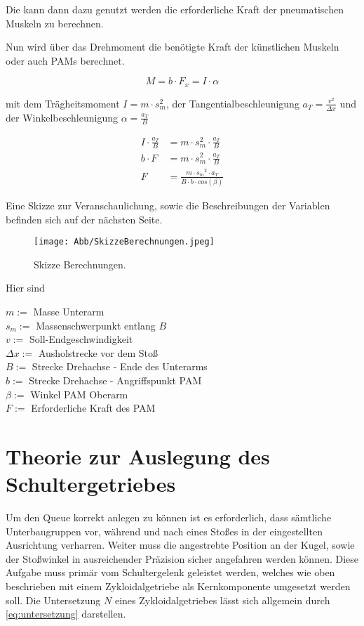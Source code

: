 		Die kann dann dazu genutzt werden die erforderliche Kraft der pneumatischen Muskeln zu berechnen. \par
		Nun wird über das Drehmoment die benötigte Kraft der künstlichen Muskeln oder auch PAMs berechnet. 



		\begin{equation}
			M = b \cdot F_x = I \cdot \alpha%
			\label{eq:DrehmomentArm}
		\end{equation}

		mit dem Trägheitsmoment \( I = m \cdot s_m^2 \), der Tangentialbeschleunigung \( a_T = \frac{v^2}{\Delta x} \) und der
		Winkelbeschleunigung \( \alpha = \frac{a_T}{B} \) \par\medskip

		\begin{align}
			I \cdot \frac{a_T}{B} &= m \cdot s_m^2 \cdot \frac{a_T}{B} \nonumber\\
			b \cdot F &= m \cdot s_m^2 \cdot \frac{a_T}{B} \nonumber\\
			F &=\frac{m \cdot {s_m}^2 \cdot a_T}{B \cdot b \cdot cos(\beta)}%
			\label{eq:Kraft-PAM}
		\end{align}

		Eine Skizze zur Veranschaulichung, sowie die Beschreibungen der Variablen befinden sich auf der nächsten Seite. 

		\newpage
		\begin{figure}[h]
			\centering
			\texttt{[image: Abb/SkizzeBerechnungen.jpeg]}
			\caption{Skizze Berechnungen.}%
			\label{fig:SkizzeBerechnungen}
		\end{figure}

		Hier sind

		\( m := \) Masse Unterarm \\
		\( s_m := \) Massenschwerpunkt entlang $ B $ \\
		\( v := \) Soll-Endgeschwindigkeit \\
		\( \Delta x := \) Ausholstrecke vor dem Stoß \\
		\( B := \) Strecke Drehachse - Ende des Unterarms \\
		\( b:= \) Strecke Drehachse - Angriffspunkt PAM \\
		\( \beta := \) Winkel PAM  Oberarm \\
		\( F:= \) Erforderliche Kraft des PAM

	\section{Theorie zur Auslegung des Schultergetriebes}
		Um den Queue korrekt anlegen zu können ist es erforderlich, dass sämtliche Unterbaugruppen vor, während und nach eines Stoßes in der eingestellten Ausrichtung verharren.
		Weiter muss die angestrebte Position an der Kugel, sowie der Stoßwinkel in ausreichender Präzision sicher angefahren werden können.
		Diese Aufgabe muss primär vom Schultergelenk geleistet werden, welches wie oben beschrieben mit einem Zykloidalgetriebe \cite{Lee.2020} \cite{Jang.2021} als Kernkomponente umgesetzt werden soll.
		Die Untersetzung \(N\) eines Zykloidalgetriebes lässt sich allgemein durch \cref{eq:untersetzung} darstellen.

